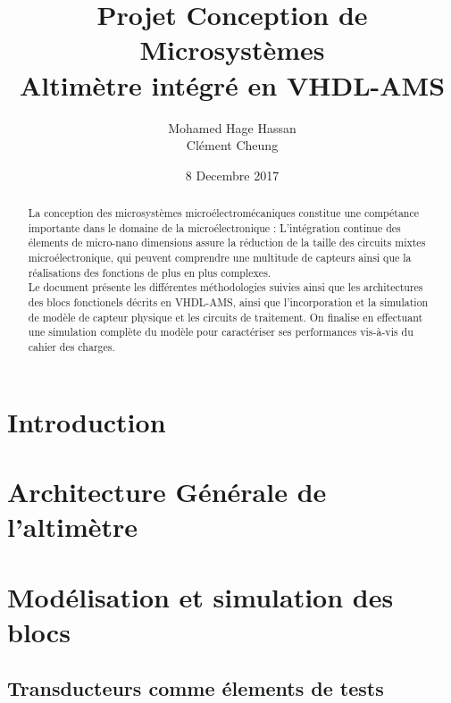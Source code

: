 \documentclass[a4paper]{article}
\begin{document}
\newcommand\textstyleEmphasis[1]{\textit{#1}}
\renewcommand{\contentsname}{Table des mati\`eres}
\renewcommand\refname{R\'ef\'erences}

\renewcommand{\abstractname}{Pr\'eambule}
\title{\textbf{Projet Conception de Microsyst\`emes \\ Altim\`etre int\'egr\'e en VHDL-AMS}}
\author{Mohamed Hage Hassan \\ Cl\'ement Cheung}
\date{8 Decembre 2017}
\maketitle
\thispagestyle{empty}

\renewcommand{\abstractname}{Pr\'emabule}

\begin{abstract}
La conception des microsyst\`emes micro\'electrom\'ecaniques constitue une comp\'etance importante dans le domaine de la micro\'electronique :
L'int\'egration continue des \'elements de micro-nano dimensions assure la r\'eduction de la taille des circuits mixtes micro\'electronique, qui
peuvent comprendre une multitude de capteurs ainsi que la r\'ealisations des fonctions de plus en plus complexes. \\
Le document pr\'esente les diff\'erentes m\'ethodologies suivies ainsi que les architectures des blocs fonctionels d\'ecrits en VHDL-AMS, ainsi
que l'incorporation et la simulation de mod\`ele de capteur physique et les circuits de traitement. On finalise en effectuant une simulation compl\`ete
du mod\`ele pour caract\'eriser ses performances vis-\`a-vis du cahier des charges.
\end{abstract}

\tableofcontents
\clearpage

\section{Introduction}

\section{Architecture G\'en\'erale de l'altim\`etre}
\section{Mod\'elisation et simulation des blocs}

\subsection{Transducteurs comme \'elements de tests}
\end{document}
